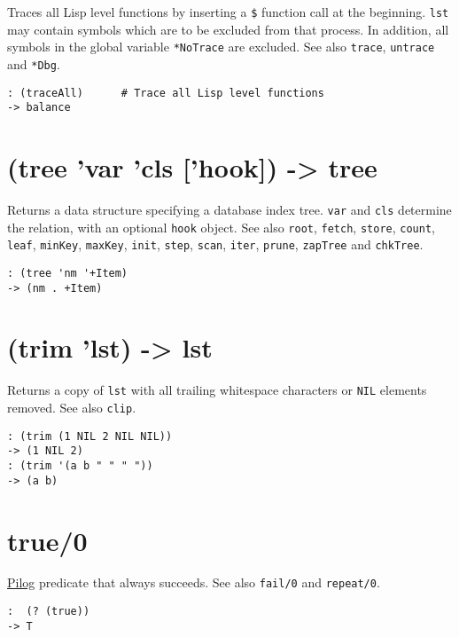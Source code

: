 {{{{{{{{Traces all Lisp level functions by inserting a \texttt{\$} function call at the
beginning. \texttt{lst} may contain symbols which are to be excluded from that
process. In addition, all symbols in the global variable \texttt{*NoTrace} are
excluded. See also \texttt{trace}, \texttt{untrace} and \texttt{*Dbg}.


\begin{verbatim}
: (traceAll)      # Trace all Lisp level functions
-> balance
\end{verbatim}

 
\section{(tree 'var 'cls ['hook]) -> tree}
\label{sec-8-1-20-25}


Returns a data structure specifying a database index tree. \texttt{var} and
\texttt{cls} determine the relation, with an optional \texttt{hook} object. See also
\texttt{root}, \texttt{fetch}, \texttt{store}, \texttt{count}, \texttt{leaf}, \texttt{minKey}, \texttt{maxKey}, \texttt{init},
\texttt{step}, \texttt{scan}, \texttt{iter}, \texttt{prune}, \texttt{zapTree} and \texttt{chkTree}.


\begin{verbatim}
: (tree 'nm '+Item)
-> (nm . +Item)
\end{verbatim}

 
\section{(trim 'lst) -> lst}
\label{sec-8-1-20-26}


Returns a copy of \texttt{lst} with all trailing whitespace characters or \texttt{NIL}
elements removed. See also \texttt{clip}.


\begin{verbatim}
: (trim (1 NIL 2 NIL NIL))
-> (1 NIL 2)
: (trim '(a b " " " "))
-> (a b)
\end{verbatim}

 
\section{true/0}
\label{sec-8-1-20-27}


\hyperref[ref.html-pilog]{Pilog} predicate that always succeeds. See also
\texttt{fail/0} and \texttt{repeat/0}.


\begin{verbatim}
:  (? (true))
-> T
\end{verbatim}

}}}}}}}}
